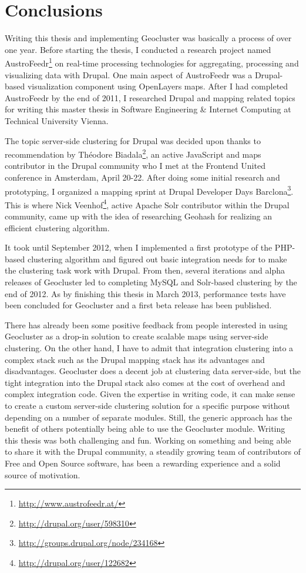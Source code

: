 \section{Conclusions}

Writing this thesis and implementing Geocluster was basically a process of over one year. Before starting the thesis, I conducted a research project named AustroFeedr\footnote{\url{http://www.austrofeedr.at/}} on real-time processing technologies for aggregating, processing and visualizing data with Drupal. One main aspect of AustroFeedr was a Drupal-based visualization component using OpenLayers maps. After I had completed AustroFeedr by the end of 2011, I researched Drupal and mapping related topics for writing this master thesis in Software Engineering \& Internet Computing at Technical University Vienna.

The topic server-side clustering for Drupal was decided upon thanks to recommendation by Th\'eodore Biadala\footnote{\url{http://drupal.org/user/598310}}, an active JavaScript and maps contributor in the Drupal community who I met at the Frontend United conference in Amsterdam, April 20-22. After doing some initial research and prototyping, I organized a mapping sprint at Drupal Developer Days Barclona\footnote{\url{http://groups.drupal.org/node/234168}}. This is where Nick Veenhof\footnote{\url{http://drupal.org/user/122682}}, active Apache Solr contributor within the Drupal community, came up with the idea of researching Geohash for realizing an efficient clustering algorithm.

It took until September 2012, when I implemented a first prototype of the PHP-based clustering algorithm and figured out basic integration needs for to make the clustering task work with Drupal. From then, several iterations and alpha releases of Geocluster led to completing MySQL and Solr-based clustering by the end of 2012. As by finishing this thesis in March 2013, performance tests have been concluded for Geocluster and a first beta release has been published.

There has already been some positive feedback from people interested in using Geocluster as a drop-in solution to create scalable maps using server-side clustering. On the other hand, I have to admit that integration clustering into a complex stack such as the Drupal mapping stack has its advantages and disadvantages. Geocluster does a decent job at clustering data server-side, but the tight integration into the Drupal stack also comes at the cost of overhead and complex integration code. Given the expertise in writing code, it can make sense to create a custom server-side clustering solution for a specific purpose without depending on a number of separate modules. Still, the generic approach has the benefit of others potentially being able to use the Geocluster module. Writing this thesis was both challenging and fun. Working on something and being able to share it with the Drupal community, a steadily growing team of contributors of Free and Open Source software, has been a rewarding experience and a solid source of motivation. 

